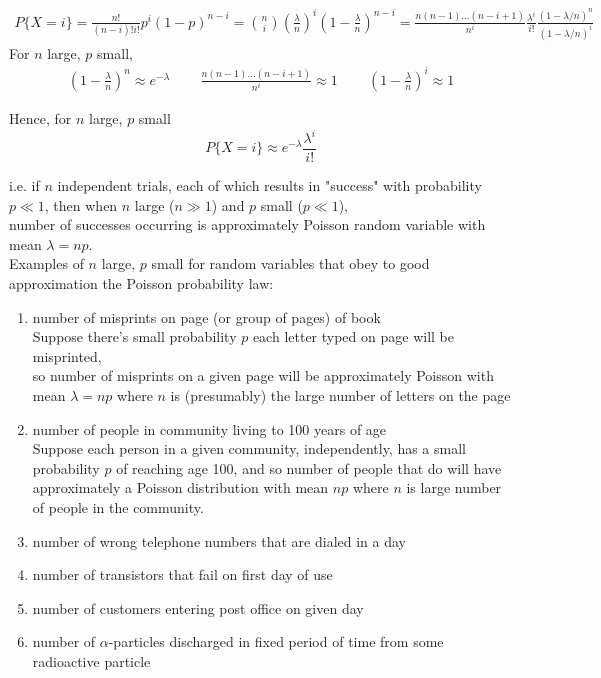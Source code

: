 \documentclass[10pt]{amsart}
\begin{document}
\begin{multicols*}{2}
\[
\begin{gathered}
	P \lbrace X = i \rbrace = \frac{ n!}{ (n-i)! i!} p^i (1- p)^{n- i} = \binom{n}{i} \left( \frac{\lambda}{n} \right)^i \left( 1 - \frac{\lambda}{n} \right)^{n-i} = \frac{ n (n-1) \dots (n- i + 1) }{n^i } \frac{\lambda^i }{i!} \frac{ ( 1 - \lambda / n )^n }{ (1 - \lambda / n)^i}
\end{gathered}
\]
For $n$ large, $p$ small, 
\[
\begin{gathered}
	\left( 1 - \frac{ \lambda}{n} \right)^n \approx e^{-\lambda} \quad \quad \, \frac{ n (n- 1 ) \dots (n- i + 1) }{n^i } \approx 1 \quad \quad \, \left( 1 - \frac{\lambda}{n} \right)^i \approx 1
\end{gathered}
\]

Hence, for $n$ large, $p$ small
\begin{equation}
	P\lbrace X = i \rbrace \approx e^{-\lambda} \frac{\lambda^i}{i!}
\end{equation}

i.e. if $n$ independent trials, each of which results in "success" with probability $p \ll 1$, then when $n$ large ($n \gg 1$) and $p$ small ($p \ll 1$), \\
number of successes occurring is approximately Poisson random variable with mean $\lambda = np$. \\

Examples of $n$ large, $p$ small for random variables that obey to good approximation the Poisson probability law:

\begin{enumerate}
	\item number of misprints on page (or group of pages) of book \\
	Suppose there's small probability $p$ each letter typed on page will be misprinted,\\
	so number of misprints on a given page will be approximately Poisson with mean $\lambda = np$ where $n$ is (presumably) the large number of letters on the page
	\item number of people in community living to 100 years of age \\
	Suppose each person in a given community, independently, has a small probability $p$ of reaching age 100, and so number of people that do will have approximately a Poisson distribution with mean $np$ where $n$ is large number of people in the community.
	\item number of wrong telephone numbers that are dialed in a day
	\item number of transistors that fail on first day of use
	\item number of customers entering post office on given day
	\item number of $\alpha$-particles discharged in fixed period of time from some radioactive particle
\end{enumerate}


\end{multicols*}
\end{document}
